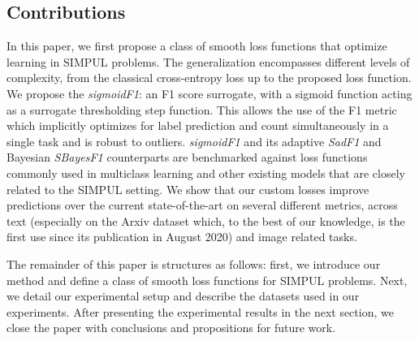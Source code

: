 \subsection{Contributions}
In this paper, we first propose a class of smooth loss functions that optimize
learning in SIMPUL problems. The generalization encompasses different levels
of complexity, from the classical cross-entropy loss up to the proposed loss
function. We propose the \emph{sigmoidF1}: an F1 score surrogate, with a
sigmoid function acting as a surrogate thresholding step function. This allows
the use of the F1 metric which implicitly optimizes for label prediction and
count simultaneously in a single task and is robust to outliers.
\emph{sigmoidF1} and its adaptive \emph{SadF1} and Bayesian \emph{SBayesF1}
counterparts are benchmarked against loss functions commonly used in
multiclass learning and other existing models that are closely related to the
SIMPUL setting. We show that our custom losses improve predictions over the
current  state-of-the-art on several different metrics, across text
(especially on the Arxiv dataset which, to the best of our knowledge, is the
first use since its publication in August 2020) and image related tasks.

The remainder of this paper is structures as follows: first, we introduce
our method and define a class of smooth loss functions for SIMPUL problems.
Next, we detail our experimental setup and describe the datasets used in our
experiments. After presenting the experimental results in the next section,
we close the paper with conclusions and propositions for future work.









